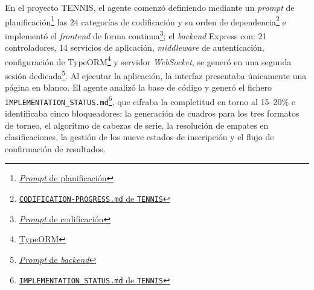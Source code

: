 En el proyecto \ac{TENNIS}, el agente comenzó definiendo mediante un \textit{prompt} de planificación\footnote{\href{https://github.com/alu0101549491/TFG-Fabian-Gonzalez-Lence/blob/main/resources/prompts/5-TennisTournamentManager/3-Codificacion/planning.prompt.md}{\textit{Prompt} de planificación}} las 24 categorías de codificación y su orden de dependencia\footnote{\href{https://github.com/alu0101549491/TFG-Fabian-Gonzalez-Lence/blob/main/projects/5-TennisTournamentManager/docs/code/CODIFICATION-PROGRESS.md}{\texttt{CODIFICATION-PROGRESS.md} de \texttt{TENNIS}}} e implementó el \textit{frontend} de forma continua\footnote{\href{https://github.com/alu0101549491/TFG-Fabian-Gonzalez-Lence/blob/main/resources/prompts/5-TennisTournamentManager/3-Codificacion/codification.prompt.md}{\textit{Prompt} de codificación}}; el \textit{backend} Express con: 21 controladores, 14 servicios de aplicación, \textit{middleware} de autenticación, configuración de TypeORM\footnote{\href{https://typeorm.io/}{TypeORM}} y servidor \textit{WebSocket}, se generó en una segunda sesión dedicada\footnote{\href{https://github.com/alu0101549491/TFG-Fabian-Gonzalez-Lence/blob/main/resources/prompts/5-TennisTournamentManager/3-Codificacion/backend.prompt.md}{\textit{Prompt} de \textit{backend}}}. Al ejecutar la aplicación, la interfaz presentaba únicamente una página en blanco. El agente analizó la base de código y generó el fichero \texttt{IMPLEMENTATION\_STATUS.md}\footnote{\href{https://github.com/alu0101549491/TFG-Fabian-Gonzalez-Lence/blob/main/projects/5-TennisTournamentManager/docs/IMPLEMENTATION_STATUS.md}{\texttt{IMPLEMENTATION\_STATUS.md} de \texttt{TENNIS}}}, que cifraba la completitud en torno al 15--20\% e identificaba cinco bloqueadores: la generación de cuadros para los tres formatos de torneo, el algoritmo de cabezas de serie, la resolución de empates en clasificaciones, la gestión de los nueve estados de inscripción y el flujo de confirmación de resultados.\\

